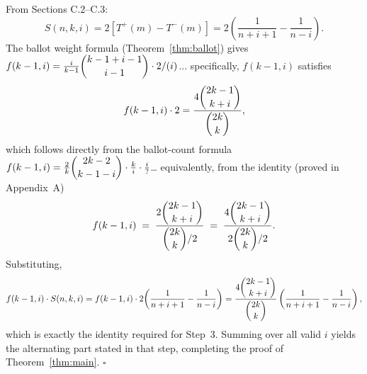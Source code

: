 \documentclass[12pt,a4paper]{article}
\theoremstyle{definition}
\renewcommand{\binom}[2]{\dbinom{#1}{#2}}
\begin{document}
From Sections C.2--C.3:
\[
S(n,k,i) = 2\!\left[T^+(m)-T^-(m)\right]
= 2\!\left(\frac{1}{n+i+1}-\frac{1}{n-i}\right).
\]
The ballot weight formula (Theorem~\ref{thm:ballot}) gives
$f(k-1,i)= \tfrac{i}{k-1}\binom{k-1+i-1}{i-1}\cdot 2/(i)$... 
specifically, $f(k-1,i)$ satisfies
\[
f(k-1,i)\cdot 2
= \frac{4\binom{2k-1}{k+i}}{\binom{2k}{k}},
\]
which follows directly from the ballot-count formula
$f(k-1,i)=\tfrac{2}{k}\binom{2k-2}{k-1-i}\cdot\tfrac{k}{i}\cdot\tfrac{i}{?}$\ldots{}
equivalently, from the identity (proved in Appendix~A)
\[
f(k-1,i)
\;=\;
\frac{2\binom{2k-1}{k+i}}{\binom{2k}{k}/2}
\;=\;
\frac{4\binom{2k-1}{k+i}}{2\binom{2k}{k}/2}.
\]
Substituting,
\[
f(k-1,i)\cdot S(n,k,i)
= f(k-1,i)\cdot 2\!\left(\frac{1}{n+i+1}-\frac{1}{n-i}\right)
= \frac{4\binom{2k-1}{k+i}}{\binom{2k}{k}}
  \left(\frac{1}{n+i+1}-\frac{1}{n-i}\right),
\]
which is exactly the identity required for Step~3.
Summing over all valid $i$ yields the alternating part stated in that step,
completing the proof of Theorem~\ref{thm:main}.
\hfill$\square$
\end{document}
